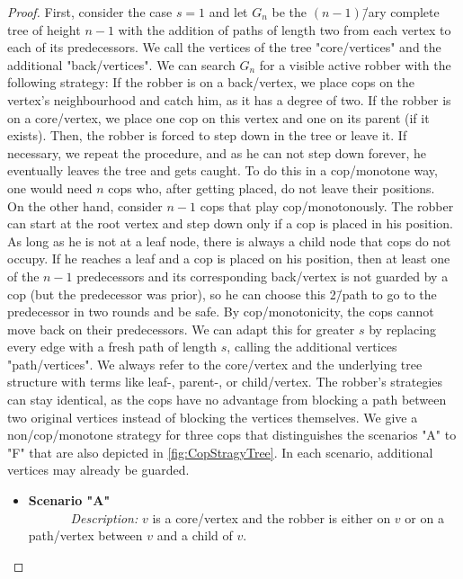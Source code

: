 \TheoremVisActCopmonotonicity*

\begin{proof}
    First, consider the case $s=1$ and let $G_n$ be the $(n-1)$\=/ary complete tree of height $n-1$ with the addition of paths of length two from each vertex to each of its predecessors. We call the vertices of the tree "core\-/vertices" and the additional "back\-/vertices". We can search $G_n$ for a visible active robber with the following strategy: If the robber is on a back\-/vertex, we place cops on the vertex's neighbourhood and catch him, as it has a degree of two. If the robber is on a core\-/vertex, we place one cop on this vertex and one on its parent (if it exists). Then, the robber is forced to step down in the tree or leave it. If necessary, we repeat the procedure, and as he can not step down forever, he eventually leaves the tree and gets caught. To do this in a cop\-/monotone way, one would need $n$ cops who, after getting placed, do not leave their positions. \\
    On the other hand, consider $n-1$ cops that play cop\-/monotonously. The robber can start at the root vertex and step down only if a cop is placed in his position. As long as he is not at a leaf node, there is always a child node that cops do not occupy. If he reaches a leaf and a cop is placed on his position, then at least one of the $n-1$ predecessors and its corresponding back\-/vertex is not guarded by a cop (but the predecessor was prior), so he can choose this 2\=/path to go to the predecessor in two rounds and be safe. By cop\-/monotonicity, the cops cannot move back on their predecessors.
    We can adapt this for greater $s$ by replacing every edge with a fresh path of length $s$, calling the additional vertices "path\-/vertices". We always refer to the core\-/vertex and the underlying tree structure with terms like leaf-, parent-, or child\-/vertex. The robber's strategies can stay identical, as the cops have no advantage from blocking a path between two original vertices instead of blocking the vertices themselves.
    We give a non\-/cop\-/monotone strategy for three cops that distinguishes the scenarios "A" to "F" that are also depicted in \cref{fig:CopStragyTree}. In each scenario, additional vertices may already be guarded. 
       \begin{itemize}
           \item \textbf{Scenario "A"} \\
           \textit{Description:} $v$ is a core\-/vertex and the robber is either on $v$ or on a path\-/vertex between $v$ and a child of $v$.\\

\end{itemize}
\end{proof}
